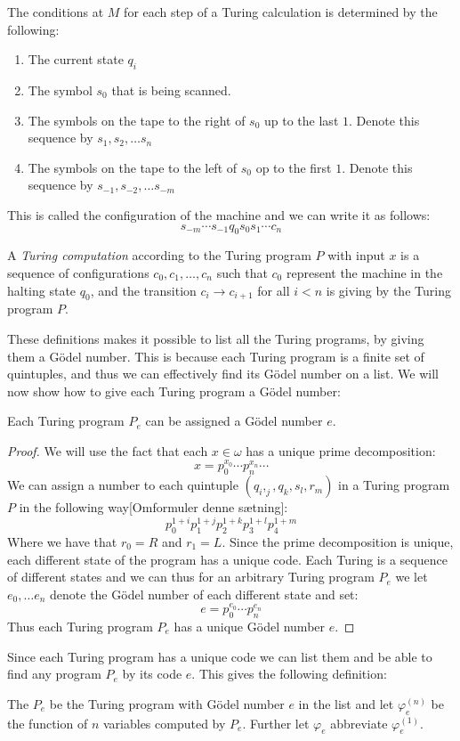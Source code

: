 \documentclass[../main.tex]{subfiles}
\begin{document}
The conditions at $M$ for each step of a Turing calculation is determined by
the following:

\begin{enumerate}
	\item The current state $q_i$
	\item The symbol $s_0$ that is being scanned.
	\item The symbols on the tape to the right of $s_0$ up to the last $1$.
		Denote this sequence by $s_1,s_2,\ldots s_n$
	\item The symbols on the tape to the left of $s_0$ op to the first $1$.
		Denote this sequence by $s_{-1},s_{-2},\ldots s_{-m}$
\end{enumerate}
This is called the configuration of the machine and we can write it as follows:
$$s_{-m}\cdots s_{-1}q_0s_0s_1\cdots c_n$$

\begin{defi}
	A \textit{Turing computation} according to the Turing program $P$ with input
	$x$ is a sequence of configurations $c_0,c_1,\ldots, c_n$ such that
	$c_0$ represent the machine in the halting state $q_0$, and the
	transition $c_i\rightarrow c_{i+1}$ for all $i<n$ is giving by the
	Turing program $P$.
\end{defi}

These definitions makes it possible to list all the Turing programs, by giving
them a Gödel number. This is because each Turing program is a finite set of
quintuples, and thus we can effectively find its Gödel number on a list. We
will now show how to give each Turing program a Gödel number:

\begin{prop}
	Each Turing program $P_e$ can be assigned a Gödel number $e$.
\end{prop}
\begin{proof}
	We will use the fact that each $x\in\omega$ has a unique
	prime decomposition:
	$$x=p_0^{x_0}\cdots p_n^{x_n}\cdots$$
	We can assign a number to each quintuple $(q_i,_j,q_k,s_l,r_m)$ in a
	Turing program $P$ in the following way[Omformuler denne sætning]:
	$$p_0^{1+i}p_1^{1+j}p_2^{1+k}p_3^{1+l}p_4^{1+m}$$
	Where we have that $r_0=R$ and $r_1=L$. Since the prime decomposition
	is unique, each different state of the program has a unique code. Each Turing
	is a sequence of different states and we can thus for an arbitrary
	Turing program $P_e$ we let $e_0,\ldots e_n$ denote the Gödel number of
	each different state and set:
	$$e=p_0^{e_0}\cdots p_n^{e_n}$$
	Thus each Turing program $P_e$ has a unique Gödel number $e$.
\end{proof}
Since each Turing program has a unique code we can list them and be able to
find any program $P_e$ by its code $e$. This gives the following definition:
\begin{defi}
	The $P_e$ be the Turing program with Gödel number $e$ in the list and
	let $\varphi_e^{(n)}$ be the function of $n$ variables computed by $P_e$.
	Further let $\varphi_e$ abbreviate $\varphi_e^{(1)}$.
\end{defi}
\end{document}
